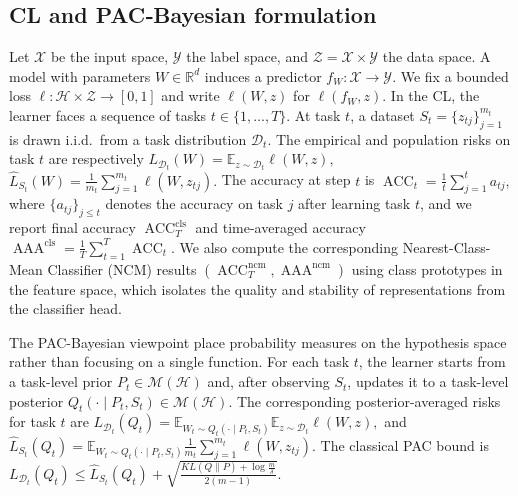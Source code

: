 \documentclass{article}
\theoremstyle{plain}
\theoremstyle{definition}
\theoremstyle{remark}
\begin{document}
\subsection{CL and PAC‑Bayesian formulation}
\label{sec:pecl-setup}

Let $\mathcal X$ be the input space, $\mathcal Y$ the label space, and $\mathcal Z = \mathcal X \times \mathcal Y$ the data space.
A model with parameters $W \in \mathbb R^d$ induces a predictor $f_W : \mathcal X \to \mathcal Y$.
We fix a bounded loss $\ell : \mathcal H \times \mathcal Z \to [0,1]$ and write $\ell(W,z)$ for $\ell(f_W,z)$.
In the CL, the learner faces a sequence of tasks $t\in\{1,\dots,T\}$. 
At task $t$, a dataset
$
S_t = \{z_{tj}\}_{j=1}^{m_t}
$
is drawn i.i.d.\ from a task distribution $\mathcal D_t$.
The empirical and population risks on task $t$ are respectively
$
L_{\mathcal D_t}(W)
=
\mathbb E_{z\sim\mathcal D_t}\ell(W,z),
$
$
\hat L_{S_t}(W)
=
\frac{1}{m_t}\sum_{j=1}^{m_t}\ell(W,z_{tj}).
$
The accuracy at step $t$ is
$
\operatorname{ACC}_t = \frac{1}{t} \sum_{j=1}^{t} a_{tj},
$ where $\{a_{tj}\}_{j\leq t}$ denotes the accuracy on task $j$ after learning task $t$,
and we report final accuracy $\operatorname{ACC}_T^{\mathrm{cls}}$ and time-averaged accuracy $\operatorname{AAA}^{\mathrm{cls}} = \frac{1}{T}\sum_{t=1}^{T} \operatorname{ACC}_t.$ We also compute the corresponding Nearest-Class-Mean Classifier (NCM) results
$(\operatorname{ACC}_T^{\mathrm{ncm}}, \operatorname{AAA}^{\mathrm{ncm}})$ using class prototypes in the feature space, which isolates the quality and stability of representations from the classifier head.


The PAC-Bayesian viewpoint place probability measures on the hypothesis space rather than focusing on a single function. For each task $t$, the learner starts from a task-level prior $P_t\in\mathcal M(\mathcal H)$ and, after observing $S_t$, updates it to a task-level posterior $Q_t(\cdot\mid P_t,S_t)\in\mathcal M(\mathcal H)$.
The corresponding posterior-averaged risks for task $t$ are
$
L_{\mathcal D_t}(Q_t)
=
\mathbb E_{W_t \sim Q_t(\cdot \mid P_t,S_t)}\mathbb E_{z\sim\mathcal D_t}\ell(W,z),
$ and $
\hat L_{S_t}(Q_t)
=
\mathbb E_{W_t \sim Q_t(\cdot \mid P_t,S_t)}\frac{1}{m_t}\sum_{j=1}^{m_t}\ell(W,z_{tj}).
$
The classical PAC bound \cite{mcallesterPACBayesianModelAveraging1999} is
$L_{\mathcal D_t}(Q_t) \leq \hat L_{S_t}(Q_t) + \sqrt{\frac{KL(Q\|P) + \log \frac{m}{\delta}}{2(m-1)}}.$
\end{document}
